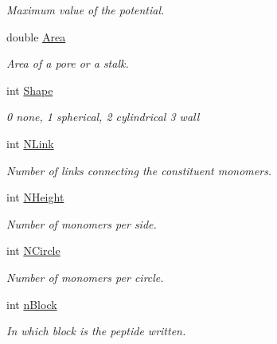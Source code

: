 \begin{DoxyCompactItemize}
\begin{DoxyCompactList}\small\item\em \-Maximum value of the potential. \end{DoxyCompactList}\item 
\hypertarget{structNANO_acedb30173c5224396eb7a95709f5c619}{double \hyperlink{structNANO_acedb30173c5224396eb7a95709f5c619}{\-Area}}\label{structNANO_acedb30173c5224396eb7a95709f5c619}

\begin{DoxyCompactList}\small\item\em \-Area of a pore or a stalk. \end{DoxyCompactList}\item 
\hypertarget{structNANO_ae10d368b167a39a5905e047ba7083b2a}{int \hyperlink{structNANO_ae10d368b167a39a5905e047ba7083b2a}{\-Shape}}\label{structNANO_ae10d368b167a39a5905e047ba7083b2a}

\begin{DoxyCompactList}\small\item\em 0 none, 1 spherical, 2 cylindrical 3 wall \end{DoxyCompactList}\item 
\hypertarget{structNANO_a73918a2decc99bcf2317d2855dada6c8}{int \hyperlink{structNANO_a73918a2decc99bcf2317d2855dada6c8}{\-N\-Link}}\label{structNANO_a73918a2decc99bcf2317d2855dada6c8}

\begin{DoxyCompactList}\small\item\em \-Number of links connecting the constituent monomers. \end{DoxyCompactList}\item 
\hypertarget{structNANO_a03b74f589ea1f823e1a80cf00b6dde33}{int \hyperlink{structNANO_a03b74f589ea1f823e1a80cf00b6dde33}{\-N\-Height}}\label{structNANO_a03b74f589ea1f823e1a80cf00b6dde33}

\begin{DoxyCompactList}\small\item\em \-Number of monomers per side. \end{DoxyCompactList}\item 
\hypertarget{structNANO_a74ded76c210b56e54322eeeb9be4dc6e}{int \hyperlink{structNANO_a74ded76c210b56e54322eeeb9be4dc6e}{\-N\-Circle}}\label{structNANO_a74ded76c210b56e54322eeeb9be4dc6e}

\begin{DoxyCompactList}\small\item\em \-Number of monomers per circle. \end{DoxyCompactList}\item 
\hypertarget{structNANO_a41bd38e6447756bd59b0f61559fa57ce}{int \hyperlink{structNANO_a41bd38e6447756bd59b0f61559fa57ce}{n\-Block}}\label{structNANO_a41bd38e6447756bd59b0f61559fa57ce}

\begin{DoxyCompactList}\small\item\em \-In which block is the peptide written. \end{DoxyCompactList}\end{DoxyCompactItemize}


